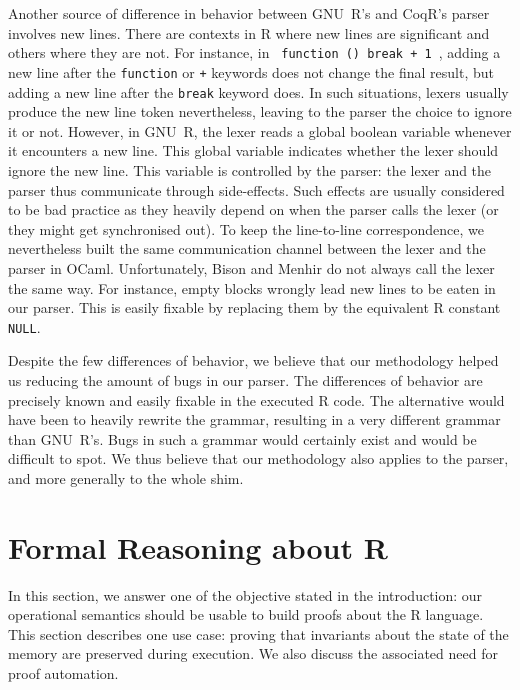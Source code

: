 \documentclass[
    sigplan,
    10pt,
    review, %
    natbib=false %
 ]{acmart}
\newcommand\CoqR{CoqR}
\begin{document}
Another source of difference in behavior
between GNU~R's and \CoqR{}'s parser
involves new lines.
There are contexts in R where new lines are significant
and others where they are not.
For instance, in \texttt{{ function () break + 1 }},
adding a new line after the \texttt{function} or \texttt{+} keywords
does not change the final result,
but adding a new line after the \texttt{break} keyword does.
%
In such situations, lexers usually produce the new line token
nevertheless, leaving to the parser the choice to ignore it or not.
However, in GNU~R, the lexer reads a global boolean variable %
whenever it encounters a new line.
This global variable indicates whether the lexer should ignore the new line.
This variable is controlled by the parser:
the lexer and the parser thus communicate through side-effects.
%
Such effects are usually considered to be bad practice
as they heavily depend on when the parser calls the lexer
(or they might get synchronised out).
%
To keep the line-to-line correspondence,
we nevertheless built the same communication channel
between the lexer and the parser in OCaml.
Unfortunately, Bison and Menhir do not always call the lexer
the same way.
%
For instance, empty blocks \texttt{{}} wrongly
lead new lines to be eaten in our parser.
This is easily fixable by replacing them
by the equivalent R constant \texttt{NULL}.

Despite the few differences of behavior,
we believe that our methodology helped us
reducing the amount of bugs in our parser.
The differences of behavior are precisely known
and easily fixable in the executed R code.
%
The alternative would have been
to heavily rewrite the grammar,
resulting in a very different grammar than GNU~R's.
Bugs in such a grammar would certainly exist
and would be difficult to spot.
%
We thus believe that our methodology also applies to the parser,
and more generally to the whole shim.

\section{Formal Reasoning about R}
\label{sec:proofs}

In this section, we answer one of the objective stated in the introduction:
our operational semantics should be usable to build proofs about the R language. This section describes one use case:
proving that invariants about the state of the memory are preserved during execution. We also discuss the associated need for proof automation.
\end{document}
